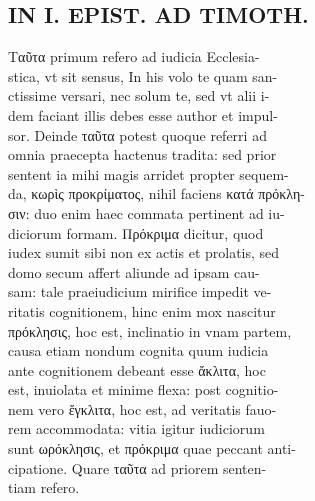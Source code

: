 \documentclass{article}
\begin{document}
\begin{pages}
\section*{IN I. EPIST. AD TIMOTH. \\
                }Ταῦτα primum refero ad iudicia Ecclesia- \\
                stica, vt sit sensus, In his volo te quam san- \\
                ctissime versari, nec solum te, sed vt alii i- \\
                dem faciant illis debes esse author et impul- \\
                sor. Deinde ταῦτα potest quoque referri ad \\
                omnia praecepta hactenus tradita: sed prior \\
                sentent ia mihi magis arridet propter sequem- \\
                da,  κωρὶς προκρίματος, nihil faciens κατά πρόκλη- \\
                σιν: duo enim haec commata pertinent ad iu- \\
                diciorum formam. Πρόκριμα dicitur, quod \\
                iudex sumit sibi non ex actis et prolatis, sed \\
                domo secum affert aliunde ad ipsam cau- \\
                sam: tale praeiudicium mirifice impedit ve- \\
                ritatis cognitionem, hinc enim mox nascitur \\
                πρόκλησις, hoc est, inclinatio in vnam partem, \\
                causa etiam nondum cognita quum iudicia \\
                ante cognitionem debeant esse ἄκλιτα, hoc \\
                est, inuiolata et minime flexa: post cognitio- \\
                nem vero ἔγκλιτα, hoc est, ad veritatis fauo- \\
                rem accommodata: vitia igitur iudiciorum \\
                sunt ωρόκλησις, et πρόκριμα quae peccant anti- \\
                cipatione. Quare ταῦτα ad priorem senten- \\
                tiam refero. \\
                

\end{pages}
\end{document}
